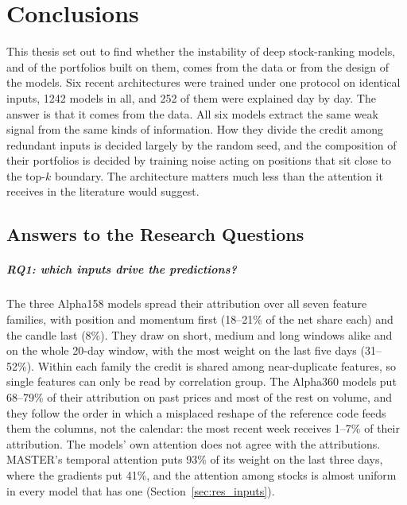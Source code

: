
\chapter{Conclusions}
\label{ch:conclusions}

This thesis set out to find whether the instability of deep stock-ranking models, and of the portfolios built on them, comes from the data or from the design of the models. Six recent architectures were trained under one protocol on identical inputs, 1242 models in all, and 252 of them were explained day by day. The answer is that it comes from the data. All six models extract the same weak signal from the same kinds of information. How they divide the credit among redundant inputs is decided largely by the random seed, and the composition of their portfolios is decided by training noise acting on positions that sit close to the top-$k$ boundary. The architecture matters much less than the attention it receives in the literature would suggest.

\section{Answers to the Research Questions}
\label{sec:conc_answers}

\paragraph{RQ1: which inputs drive the predictions?} The three Alpha158 models spread their attribution over all seven feature families, with position and momentum first (18--21\% of the net share each) and the candle last (8\%). They draw on short, medium and long windows alike and on the whole 20-day window, with the most weight on the last five days (31--52\%). Within each family the credit is shared among near-duplicate features, so single features can only be read by correlation group. The Alpha360 models put 68--79\% of their attribution on past prices and most of the rest on volume, and they follow the order in which a misplaced reshape of the reference code feeds them the columns, not the calendar: the most recent week receives 1--7\% of their attribution. The models' own attention does not agree with the attributions. MASTER's temporal attention puts 93\% of its weight on the last three days, where the gradients put 41\%, and the attention among stocks is almost uniform in every model that has one (Section~\ref{sec:res_inputs}).

